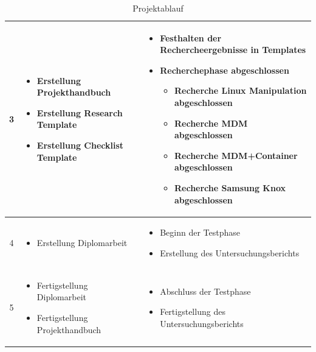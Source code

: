 \begin{table}
\begin{tabular}{| c | p{6cm} | p{7cm} |}
		\\\hline %
		3
		&%
		\begin{itemize}
			\item Erstellung Projekthandbuch
			\item Erstellung Research Template
			\item Erstellung Checklist Template
		\end{itemize}
		&%
		\begin{itemize}
			\item Festhalten der Rechercheergebnisse in Templates
			\item Recherchephase abgeschlossen
			\begin{itemize}
				\item Recherche Linux Manipulation abgeschlossen
				\item Recherche MDM abgeschlossen
				\item Recherche MDM+Container abgeschlossen
				\item Recherche Samsung Knox abgeschlossen
			\end{itemize}
		\end{itemize}
		\\\hline %
		4
		&%
		\begin{itemize}
			\item Erstellung Diplomarbeit
		\end{itemize}
		&%
		\begin{itemize}
			\item Beginn der Testphase
			\item Erstellung des Untersuchungsberichts
		\end{itemize}
		\\\hline %
		5
		&%
		\begin{itemize}
			\item Fertigstellung Diplomarbeit
			\item Fertigstellung Projekthandbuch
		\end{itemize}
		&%
		\begin{itemize}
			\item Abschluss der Testphase
			\item Fertigstellung des Untersuchungsberichts
		\end{itemize}
		\\\hline %
	\end{tabular}
	\caption{Projektablauf}
\end{table}

